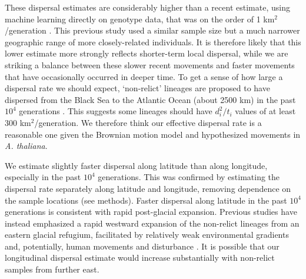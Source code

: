 \documentclass[12pt]{article}
\begin{document}
These dispersal estimates are considerably higher than a recent estimate, using machine learning directly on genotype data, that was on the order of 1 km$^2$/generation \citep{smith2023dispersal}. 
This previous study used a similar sample size but a much narrower geographic range of more closely-related individuals.
It is therefore likely that this lower estimate more strongly reflects shorter-term local dispersal, while we are striking a balance between these slower recent movements and faster movements that have occasionally occurred in deeper time.
To get a sense of how large a dispersal rate we should expect, `non-relict' lineages are proposed to have dispersed from the Black Sea to the Atlantic Ocean (about 2500 km) in the past $10^4$ generations \citep{lee2017post,hsu2019postglacial}.
This suggests some lineages should have $d_i^2/t_i$ values of at least 300 km$^2$/generation.
We therefore think our effective dispersal rate is a reasonable one given the Brownian motion model and hypothesized movements in \textit{A. thaliana}.

We estimate slightly faster dispersal along latitude than along longitude, especially in the past $10^4$ generations. 
This was confirmed by estimating the dispersal rate separately along latitude and longitude, removing dependence on the sample locations (see methods).
Faster dispersal along latitude in the past $10^4$ generations is consistent with rapid post-glacial expansion.
Previous studies have instead emphasized a rapid westward expansion of the non-relict lineages from an eastern glacial refugium, facilitated by relatively weak environmental gradients and, potentially, human movements and disturbance \citep{alonso2016,lee2017post,hsu2019postglacial}.
It is possible that our longitudinal dispersal estimate would increase substantially with non-relict samples from further east.

\end{document}
